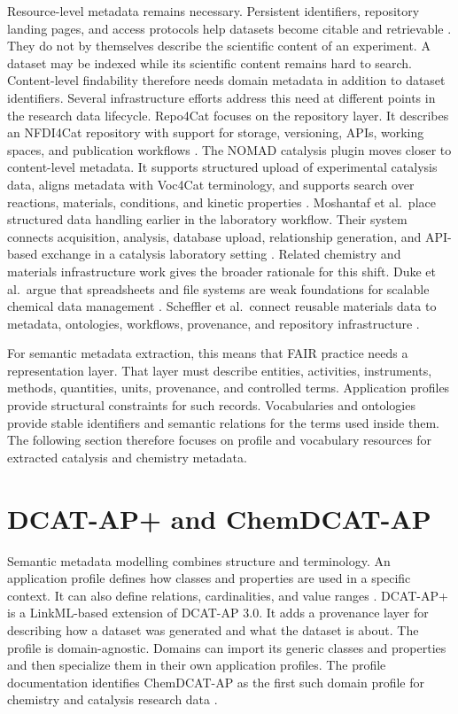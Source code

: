 Resource-level metadata remains necessary.
Persistent identifiers, repository landing pages, and access protocols help datasets become citable and retrievable \cite{wilkinson2016fair}.
They do not by themselves describe the scientific content of an experiment.
A dataset may be indexed while its scientific content remains hard to search.
Content-level findability therefore needs domain metadata in addition to dataset identifiers.
Several infrastructure efforts address this need at different points in the research data lifecycle.
Repo4Cat focuses on the repository layer.
It describes an \ac{NFDI4Cat} repository with support for storage, versioning, APIs, working spaces, and publication workflows \cite{kushnarenko2025repo4cat}.
The \ac{NOMAD} catalysis plugin moves closer to content-level metadata.
It supports structured upload of experimental catalysis data, aligns metadata with \ac{Voc4Cat} terminology, and supports search over reactions, materials, conditions, and kinetic properties \cite{schumann2025nomad}.
Moshantaf et al.\ place structured data handling earlier in the laboratory workflow.
Their system connects acquisition, analysis, database upload, relationship generation, and API-based exchange in a catalysis laboratory setting \cite{moshantaf2024advancing}.
Related chemistry and materials infrastructure work gives the broader rationale for this shift.
Duke et al.\ argue that spreadsheets and file systems are weak foundations for scalable chemical data management \cite{duke2022datastorage}.
Scheffler et al.\ connect reusable materials data to metadata, ontologies, workflows, provenance, and repository infrastructure \cite{scheffler2022fair}.

For semantic metadata extraction, this means that \ac{FAIR} practice needs a representation layer.
That layer must describe entities, activities, instruments, methods, quantities, units, provenance, and controlled terms.
Application profiles provide structural constraints for such records.
Vocabularies and ontologies provide stable identifiers and semantic relations for the terms used inside them.
The following section therefore focuses on profile and vocabulary resources for extracted catalysis and chemistry metadata.


\section{DCAT-AP+ and ChemDCAT-AP}
\label{sec:dcat-ap-plus-chemdcat-ap}

Semantic metadata modelling combines structure and terminology.
An application profile defines how classes and properties are used in a specific context.
It can also define relations, cardinalities, and value ranges \cite{Hunter2001Combining}.
\ac{DCAT-AP+} is a \ac{LinkML}-based extension of \ac{DCAT-AP} 3.0.
It adds a provenance layer for describing how a dataset was generated and what the dataset is about.
The profile is domain-agnostic.
Domains can import its generic classes and properties and then specialize them in their own application profiles.
The profile documentation identifies \ac{ChemDCAT-AP} as the first such domain profile for chemistry and catalysis research data \cite{stroemert2026chemdcat,dcatapplusDocumentation}.

